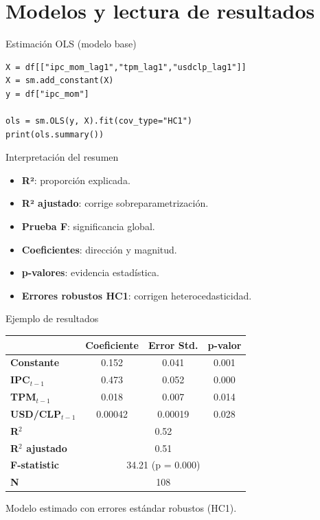 \documentclass[aspectratio=169,10pt]{beamer}
\begin{document}

\section{Modelos y lectura de resultados}

\begin{frame}[fragile]{Estimación OLS (modelo base)}
\begin{lstlisting}
X = df[["ipc_mom_lag1","tpm_lag1","usdclp_lag1"]]
X = sm.add_constant(X)
y = df["ipc_mom"]

ols = sm.OLS(y, X).fit(cov_type="HC1")
print(ols.summary())
\end{lstlisting}
\end{frame}

\begin{frame}{Interpretación del resumen}
  \begin{itemize}
    \item \textbf{R²}: proporción explicada.
    \item \textbf{R² ajustado}: corrige sobreparametrización.
    \item \textbf{Prueba F}: significancia global.
    \item \textbf{Coeficientes}: dirección y magnitud.
    \item \textbf{p-valores}: evidencia estadística.
    \item \textbf{Errores robustos HC1}: corrigen heterocedasticidad.
  \end{itemize}
\end{frame}

\begin{frame}{Ejemplo de resultados}

\centering
\small
\begin{tabular}{lccc}
\hline
 & Coeficiente & Error Std. & p-valor \\
\hline
\textbf{Constante}       & 0.152 & 0.041 & 0.001 \\
\textbf{IPC$_{t-1}$}     & 0.473 & 0.052 & 0.000 \\
\textbf{TPM$_{t-1}$}     & 0.018 & 0.007 & 0.014 \\
\textbf{USD/CLP$_{t-1}$} & 0.00042 & 0.00019 & 0.028 \\
\hline
\textbf{R$^2$} & \multicolumn{3}{c}{0.52} \\
\textbf{R$^2$ ajustado} & \multicolumn{3}{c}{0.51} \\
\textbf{F-statistic} & \multicolumn{3}{c}{34.21 (p = 0.000)} \\
\textbf{N} & \multicolumn{3}{c}{108} \\
\hline
\end{tabular}

\vspace{0.4cm}
\small Modelo estimado con errores estándar robustos (HC1).

\end{frame}
\end{document}
